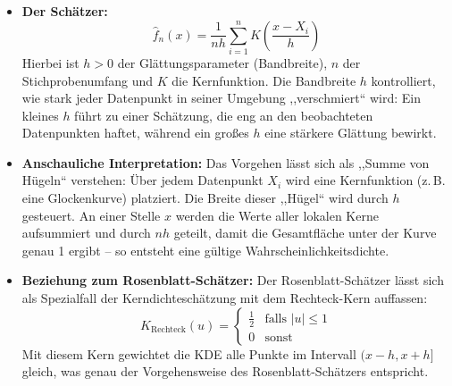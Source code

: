 \documentclass[a4paper, 11pt]{scrartcl}
\begin{document}
\begin{itemize}
	\item \textbf{Der Schätzer:}
	      \begin{equation}
	      	\hat{f}_n(x) = \frac{1}{nh} \sum_{i=1}^{n} K\left(\frac{x - X_i}{h}\right)
	      \end{equation}
	      Hierbei ist $h > 0$ der Glättungsparameter (Bandbreite), $n$ der Stichprobenumfang und $K$ die Kernfunktion. Die Bandbreite $h$ kontrolliert, wie stark jeder Datenpunkt in seiner Umgebung ,,verschmiert`` wird: Ein kleines $h$ führt zu einer Schätzung, die eng an den beobachteten Datenpunkten haftet, während ein großes $h$ eine stärkere Glättung bewirkt.
	      
	\item \textbf{Anschauliche Interpretation:} Das Vorgehen lässt sich als ,,Summe von Hügeln`` verstehen: Über jedem Datenpunkt $X_i$ wird eine Kernfunktion (z.\,B. eine Glockenkurve) platziert. Die Breite dieser ,,Hügel`` wird durch $h$ gesteuert. An einer Stelle $x$ werden die Werte aller lokalen Kerne aufsummiert und durch $nh$ geteilt, damit die Gesamtfläche unter der Kurve genau 1 ergibt – so entsteht eine gültige Wahrscheinlichkeitsdichte.
	      
	\item \textbf{Beziehung zum Rosenblatt-Schätzer:} Der Rosenblatt-Schätzer lässt sich als Spezialfall der Kerndichteschätzung mit dem Rechteck-Kern auffassen:
	      \begin{equation}
	      	K_{\text{Rechteck}}(u) = \begin{cases}
	      		\frac{1}{2} & \text{falls } |u| \le 1 \\
	      		0 & \text{sonst}
	      	\end{cases}
	      \end{equation}
	      Mit diesem Kern gewichtet die KDE alle Punkte im Intervall $(x-h, x+h]$ gleich, was genau der Vorgehensweise des Rosenblatt-Schätzers entspricht.
\end{itemize}
\end{document}
